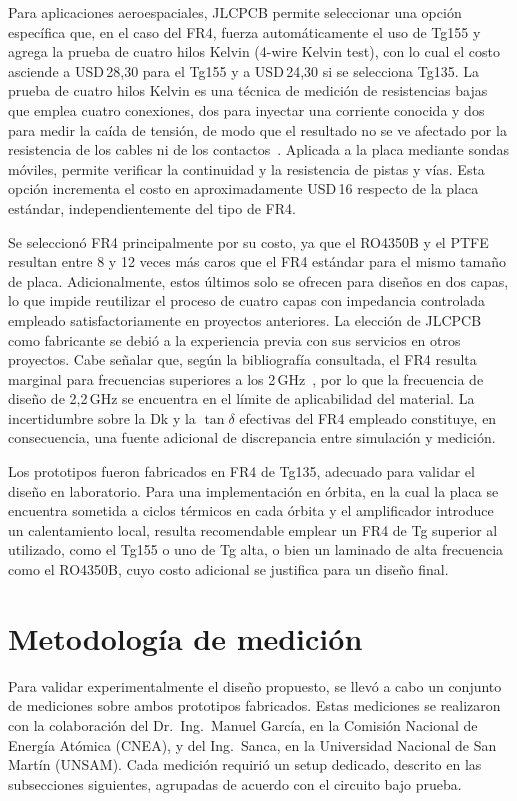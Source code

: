 Para aplicaciones aeroespaciales, JLCPCB permite seleccionar una opción específica que, en el caso del FR4, fuerza automáticamente el uso de Tg155 y agrega la prueba de cuatro hilos Kelvin (4-wire Kelvin test), con lo cual el costo asciende a USD\,28,30 para el Tg155 y a USD\,24,30 si se selecciona Tg135. La prueba de cuatro hilos Kelvin es una técnica de medición de resistencias bajas que emplea cuatro conexiones, dos para inyectar una corriente conocida y dos para medir la caída de tensión, de modo que el resultado no se ve afectado por la resistencia de los cables ni de los contactos~\cite{JLCFlyingProbe}. Aplicada a la placa mediante sondas móviles, permite verificar la continuidad y la resistencia de pistas y vías. Esta opción incrementa el costo en aproximadamente USD\,16 respecto de la placa estándar, independientemente del tipo de FR4.

Se seleccionó FR4 principalmente por su costo, ya que el RO4350B y el PTFE resultan entre 8 y 12 veces más caros que el FR4 estándar para el mismo tamaño de placa. Adicionalmente, estos últimos solo se ofrecen para diseños en dos capas, lo que impide reutilizar el proceso de cuatro capas con impedancia controlada empleado satisfactoriamente en proyectos anteriores. La elección de JLCPCB como fabricante se debió a la experiencia previa con sus servicios en otros proyectos. Cabe señalar que, según la bibliografía consultada, el FR4 resulta marginal para frecuencias superiores a los 2\,GHz~\cite{JLCFR4}, por lo que la frecuencia de diseño de 2,2\,GHz se encuentra en el límite de aplicabilidad del material. La incertidumbre sobre la Dk y la $\tan\delta$ efectivas del FR4 empleado constituye, en consecuencia, una fuente adicional de discrepancia entre simulación y medición.

Los prototipos fueron fabricados en FR4 de Tg135, adecuado para validar el diseño en laboratorio. Para una implementación en órbita, en la cual la placa se encuentra sometida a ciclos térmicos en cada órbita y el amplificador introduce un calentamiento local, resulta recomendable emplear un FR4 de Tg superior al utilizado, como el Tg155 o uno de Tg alta, o bien un laminado de alta frecuencia como el RO4350B, cuyo costo adicional se justifica para un diseño final.

\section{Metodología de medición} \label{sec:metodologia_medicion}
Para validar experimentalmente el diseño propuesto, se llevó a cabo un conjunto de mediciones sobre ambos prototipos fabricados. Estas mediciones se realizaron con la colaboración del Dr.~Ing.~Manuel García, en la Comisión Nacional de Energía Atómica (CNEA), y del Ing.~Sanca, en la Universidad Nacional de San Martín (UNSAM). Cada medición requirió un setup dedicado, descrito en las subsecciones siguientes, agrupadas de acuerdo con el circuito bajo prueba.

